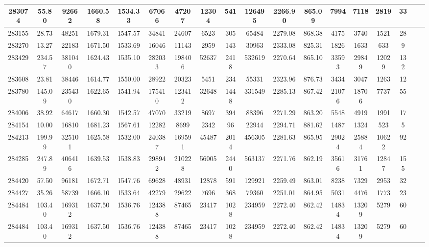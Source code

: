 \documentclass[10pt]{extarticle}
\begin{document}
\begin{longtable}{|c|c|c|c|c|c|c|c|c|c|c|c|c|c|c|c|c|c|}
\hline 
283074&55.80&92662&1660.58&1534.33&67066&47207&12304&541&126495&2266.90&865.09&7994&7118&2819&33 \\ 
\hline 
283155&28.73&48251&1679.31&1547.57&34841&24607&6523&305&65484&2279.08&868.38&4175&3740&1521&28 \\ 
\hline 
283270&13.27&22183&1671.50&1533.69&16046&11143&2959&143&30963&2333.08&825.31&1826&1633&633&9 \\ 
\hline 
283429&234.57&381040&1624.43&1535.10&282033&198406&52637&2418&532619&2270.64&865.10&33593&29849&12029&132 \\ 
\hline 
283608&23.81&38446&1614.77&1550.00&28922&20323&5451&234&55331&2323.96&876.73&3434&3047&1263&12 \\ 
\hline 
283780&145.09&235430&1622.65&1541.94&175410&123412&32648&1448&331549&2285.13&867.42&21076&18706&7737&55 \\ 
\hline 
284006&38.92&64617&1660.30&1542.57&47070&33219&8697&394&88396&2271.29&863.20&5548&4919&1991&17 \\ 
\hline 
284154&10.00&16810&1681.23&1567.61&12282&8699&2342&96&22944&2294.71&881.62&1487&1324&523&5 \\ 
\hline 
284213&199.99&325101&1625.58&1532.00&240387&169591&45487&2014&456305&2281.63&865.95&29024&25884&10622&92 \\ 
\hline 
284285&247.89&406416&1639.53&1538.83&298942&210228&56005&2440&563137&2271.76&862.19&35616&31761&12847&155 \\ 
\hline 
284420&57.50&96181&1672.71&1547.76&69628&48931&12878&591&129921&2259.49&863.01&8238&7329&2953&32 \\ 
\hline 
284427&35.26&58739&1666.10&1533.64&42279&29622&7696&368&79360&2251.01&864.95&5031&4476&1773&23 \\ 
\hline 
284484&103.40&169312&1637.50&1536.76&124388&87465&23417&1028&234959&2272.40&862.42&14834&13209&5279&60 \\ 
\hline 
284484&103.40&169312&1637.50&1536.76&124388&87465&23417&1028&234959&2272.40&862.42&14834&13209&5279&60 \\ 
\hline 
\end{longtable} 
\end{document}

